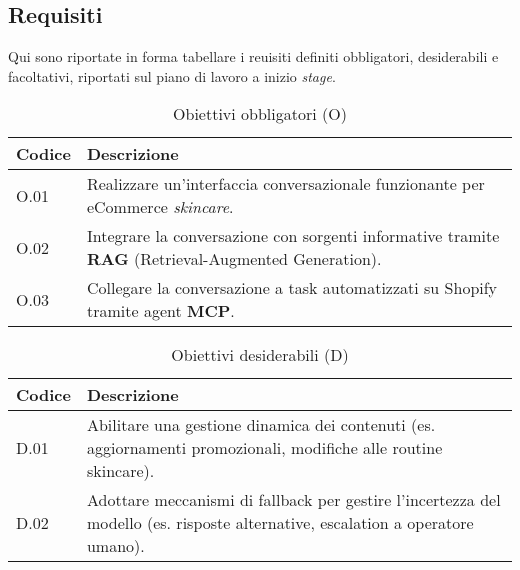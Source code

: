 \subsection{Requisiti}

Qui sono riportate in forma tabellare i reuisiti definiti obbligatori, desiderabili e facoltativi, riportati sul piano di lavoro a inizio \emph{stage}.

\begin{table}[H]
    \centering
    \caption{Obiettivi obbligatori (O)}
    \begin{tabularx}{\textwidth}{@{}l X@{}}
      \toprule
      \textbf{Codice} & \textbf{Descrizione} \\
      \midrule
      O.01 & Realizzare un'interfaccia conversazionale funzionante per eCommerce \textit{skincare}. \\
      \midrule
      O.02 & Integrare la conversazione con sorgenti informative tramite \textbf{RAG} (Retrieval-Augmented Generation). \\
      \midrule
      O.03 & Collegare la conversazione a task automatizzati su Shopify tramite agent \textbf{MCP}. \\
      \bottomrule
    \end{tabularx}
  \end{table}
  
  \vspace{8pt}
  
  \begin{table}[H]
    \centering
    \caption{Obiettivi desiderabili (D)}
    \begin{tabularx}{\textwidth}{@{}l X@{}}
      \toprule
      \textbf{Codice} & \textbf{Descrizione} \\
      \midrule
      D.01 & Abilitare una gestione dinamica dei contenuti (es. aggiornamenti promozionali, modifiche alle routine skincare). \\
      \midrule
      D.02 & Adottare meccanismi di fallback per gestire l'incertezza del modello (es. risposte alternative, escalation a operatore umano). \\
      \bottomrule
    \end{tabularx}
  \end{table}
  
  \vspace{8pt}
  
